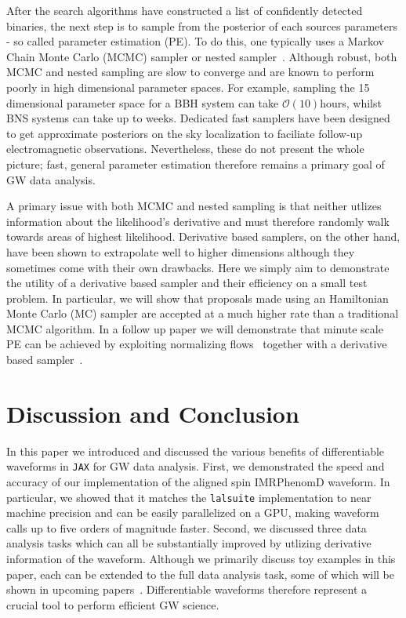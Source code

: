 \documentclass[twocolumn]{aastex631}
\newcommand{\jax}{\texttt{JAX}\xspace}
\newcommand{\lalsuite}{\texttt{lalsuite}\xspace}
\begin{document}
After the search algorithms have constructed a list of confidently detected binaries, the next step is to sample from the posterior of each sources parameters - so called parameter estimation (PE).
To do this, one typically uses a Markov Chain Monte Carlo (MCMC) sampler or nested sampler~\citep{multinest, dynesty}.
Although robust, both MCMC and nested sampling are slow to converge and are known to perform poorly in high dimensional parameter spaces.
For example, sampling the 15 dimensional parameter space for a BBH system can take $\mathcal{O}(10)$hours, whilst BNS systems can take up to weeks.
Dedicated fast samplers have been designed to get approximate posteriors on the sky localization to faciliate follow-up electromagnetic observations.
Nevertheless, these do not present the whole picture; fast, general parameter estimation therefore remains a primary goal of GW data analysis.

A primary issue with both MCMC and nested sampling is that neither utlizes information about the likelihood's derivative and must therefore randomly walk towards areas of highest likelihood.
Derivative based samplers, on the other hand, have been shown to extrapolate well to higher dimensions although they sometimes come with their own drawbacks.
Here we simply aim to demonstrate the utility of a derivative based sampler and their efficiency on a small test problem.
In particular, we will show that proposals made using an Hamiltonian Monte Carlo (MC) sampler are accepted at a much higher rate than a traditional MCMC algorithm.
In a follow up paper we will demonstrate that minute scale PE can be achieved by exploiting normalizing flows~\citep{2022arXiv221106397W, Gabrie:2021tlu} together with a derivative based sampler~\citep{PEpaper}.


\section{Discussion and Conclusion}
\label{subsec:discussion}

In this paper we introduced and discussed the various benefits of differentiable waveforms in \jax for GW data analysis.
First, we demonstrated the speed and accuracy of our implementation of the aligned spin IMRPhenomD waveform.
In particular, we showed that it matches the \lalsuite implementation to near machine precision and can be easily parallelized on a GPU, making waveform calls up to five orders of magnitude faster.
Second, we discussed three data analysis tasks which can all be substantially improved by utlizing derivative information of the waveform.
Although we primarily discuss toy examples in this paper, each can be extended to the full data analysis task, some of which will be shown in upcoming papers~\citep{PEpaper}.
Differentiable waveforms therefore represent a crucial tool to perform efficient GW science.
\end{document}
